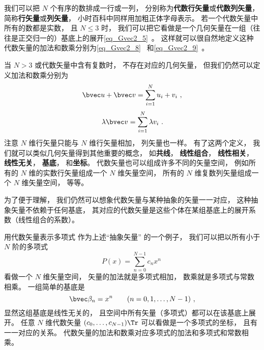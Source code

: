 

我们可以把 $N$ 个有序的数排成一行或一列， 分别称为\textbf{代数行矢量}或\textbf{代数列矢量}， 简称\textbf{行矢量}或\textbf{列矢量}， 小时百科中同样用加粗正体字母表示。 若一个代数矢量中所有的数都是实数， 且 $N \leqslant 3$%
时， 我们可以把它看做是一个几何矢量在一组（往往是正交归一的）基底上的展开\autoref{eq_Gvec2_5}~。 这样就可以很自然地定义这种代数矢量的加法和数乘分别为\autoref{eq_Gvec2_8}~ 和\autoref{eq_Gvec2_9}~。

当 $N > 3$ 或代数矢量中含有复数时， 不存在对应的几何矢量， 但我们仍然可以定义加法和数乘分别为
\begin{equation}
\bvec u + \bvec v = \sum_{i = 1}^N u_i + v_i~,
\end{equation}
\begin{equation}
\lambda \bvec v = \sum_{i = 1}^N \lambda v_i~.
\end{equation}
注意 $N$ 维行矢量只能与 $N$ 维行矢量相加， 列矢量也一样。 有了这两个定义， 我们就可以类似几何矢量得到其他重要的概念， 如\textbf{共线}， \textbf{线性组合}， \textbf{线性相关}， \textbf{线性无关}， \textbf{基底}， 和\textbf{坐标}。 代数矢量也可以组成许多不同的矢量空间， 例如所有的 $N$ 维的实数行矢量组成一个 $N$ 维矢量空间， 所有的 $N$ 维复数列矢量组成一个 $N$ 维矢量空间， 等等。

为了便于理解， 我们仍然可以想象代数矢量与某种抽象的矢量一一对应， 这种抽象矢量不依赖于任何基底， 其对应的代数矢量是这些个体在某组基底上的展开系数（线性组合的系数）。

\begin{example}{用代数矢量表示多项式}
作为上述“抽象矢量” 的一个例子， 我们可以把以所有小于 $N$ 阶的多项式
\begin{equation}
P(x) = \sum_{n = 0}^{N-1} c_n x^n~
\end{equation}
看做一个 $N$ 维矢量空间， 矢量的加法就是多项式相加， 数乘就是多项式与常数相乘。 一组简单的基底是
\begin{equation}
\bvec \beta_n = x^n \qquad (n = 0, 1, \dots, N-1)~,
\end{equation}
显然这组基底是线性无关的， 且空间中所有矢量（多项式）都可以在该基底上展开。 任意 $N$ 维代数矢量 $(c_0, \dots, c_{N-1})\Tr$ 可以看做是一个多项式的坐标， 且有一一对应的关系。 代数矢量的加法和数乘对应多项式的加法和多项式和常数相乘。
\end{example}

